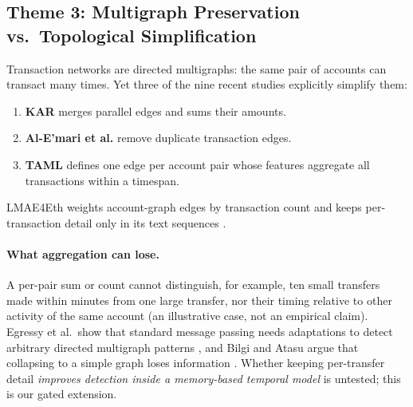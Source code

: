 \documentclass[11pt,a4paper]{article}
\begin{document}
\subsection{Theme 3: Multigraph Preservation vs.\ Topological Simplification}
Transaction networks are directed multigraphs: the same pair of accounts can transact many times. Yet three of the nine recent studies explicitly simplify them:
\begin{enumerate}[leftmargin=*]
    \item \textbf{KAR} \cite{tian2025kar} merges parallel edges and sums their amounts.
    \item \textbf{Al-E'mari et al.} \cite{alemari2026explainable} remove duplicate transaction edges.
    \item \textbf{TAML} \cite{rico2026taml} defines one edge per account pair whose features aggregate all transactions within a timespan.
\end{enumerate}
LMAE4Eth weights account-graph edges by transaction count and keeps per-transaction detail only in its text sequences \cite{jia2025lmae4eth}.

\paragraph{What aggregation can lose.} A per-pair sum or count cannot distinguish, for example, ten small transfers made within minutes from one large transfer, nor their timing relative to other activity of the same account (an illustrative case, not an empirical claim). Egressy et al.\ show that standard message passing needs adaptations to detect arbitrary directed multigraph patterns \cite{egressy2024multigraph}, and Bilgi and Atasu argue that collapsing to a simple graph loses information \cite{bilgi2026mega}. Whether keeping per-transfer detail \emph{improves detection inside a memory-based temporal model} is untested; this is our gated extension.
\end{document}
